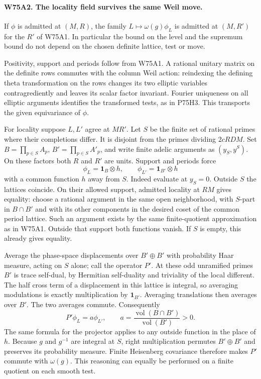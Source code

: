 \paragraph{W75A2. The locality field survives the same Weil move.}
If $\phi$ is admitted at $(M,R)$, the family
$L\mapsto\omega(g)\phi_L$ is admitted at $(M,R')$ for the $R'$
of W75A1. In particular the bound on the level and the supremum
bound do not depend on the chosen definite lattice, test or move.

Positivity, support and periods follow from W75A1. A rational unitary
matrix on the definite rows commutes with the column Weil action:
reindexing the defining theta transformation on the rows changes
its two elliptic variables contragrediently and leaves its scalar
factor invariant. Fourier uniqueness on all elliptic arguments
identifies the transformed tests, as in P75H3. This transports the
given equivariance of $\phi$.

For locality suppose $L,L'$ agree at $MR'$. Let $S$ be the finite
set of rational primes where their completions differ. It is
disjoint from the primes dividing $2cRDM$. Set
$B=\prod_{p\in S}A_p$, $B'=\prod_{p\in S}A'_p$, and write
finite adelic arguments as $(y_S,y^S)$. On these factors both $R$
and $R'$ are units. Support and periods force
\[
 \phi_L=\mathbf1_B\otimes h,\qquad
 \phi_{L'}=\mathbf1_{B'}\otimes h
\]
with a common function $h$ away from $S$. Indeed evaluate at
$y_S=0$. Outside $S$ the lattices coincide. On their allowed support,
admitted locality at $RM$ gives equality: choose a rational
argument in the same open neighborhood, with $S$-part in
$B\cap B'$ and with its other components in the desired coset of
the common period lattice. Such an argument exists by the same
finite-quotient approximation as in W75A1. Outside that support
both functions vanish. If $S$ is empty, this already gives equality.

Average the phase-space displacements over $B'\oplus B'$ with
probability Haar measure, acting on $S$ alone; call the operator
$P'$. At these odd unramified primes $B'$ is trace self-dual, by
Hermitian self-duality and triviality of the local different.
The half cross term of a displacement in this lattice is integral,
so averaging modulations is exactly multiplication by
$\mathbf1_{B'}$. Averaging translations then averages over $B'$.
The two averages commute. Consequently
\[
 P'\phi_L=a\phi_{L'},\qquad
        a=\frac{\operatorname{vol}(B\cap B')}{\operatorname{vol}(B')}>0.
\]
The same formula for the projector applies to any outside function
in the place of $h$. Because $g$ and $g^{-1}$ are integral at $S$,
right multiplication permutes $B'\oplus B'$ and preserves its
probability measure. Finite Heisenberg covariance therefore makes
$P'$ commute with $\omega(g)$. This reasoning can equally be
performed on a finite quotient on each smooth test.

